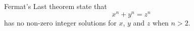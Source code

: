 \documentclass[tikz, border=10pt]{standalone}
\begin{document}
    \begin{tcolorbox}[ribbonbox, title=A Ribbonbox, fonttitle=\sffamily\bfseries]
        Fermat's Last theorem state that\\
        \begin{equation*}
            x^n+y^n=z^n
        \end{equation*}
        has no non-zero integer solutions for $x$, $y$ and $z$ when $n>2$.
    \end{tcolorbox}
\end{document}
